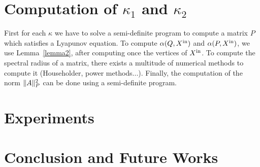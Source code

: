 \documentclass[10pt]{article}
\begin{document}
\section{Computation of $\kappa_1$ and $\kappa_2$}

First for each $\kappa$ we have to solve a semi-definite program to compute a matrix $P$ which satisfies 
a Lyapunov equation.
To compute $\alpha(Q,X^\mathrm{in})$ and $\alpha(P,X^\mathrm{in})$, we use Lemma~\ref{lemma2}, after computing once the vertices of $X^\mathrm{in}$. 
To compute the spectral radius of a matrix, there exists a multitude of numerical methods to compute it (Householder, power methods...). Finally, the computation of the norm $\| A\|_P^2$ can be done using a semi-definite program.

\section{Experiments}

\section{Conclusion and Future Works} 


 
\end{document}
